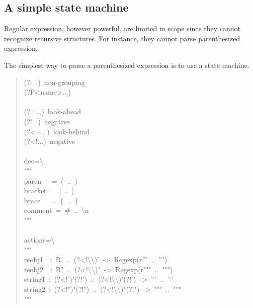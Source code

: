 \documentclass[10pt,english]{article}
\begin{document}

\hypertarget{a-simple-state-machine}{}
\subsection*{A simple state machine}

Regular expression, however powerful, are limited in scope since they
cannot recognize recursive structures. For instance, they cannot parse
parenthesized expression.

The simplest way to parse a parenthesized expression is to use a state
machine.
\begin{quote}
\begin{ttfamily}\begin{flushleft}
\mbox{(?:...)~non-grouping}\\
\mbox{(?P<name>...)~}\\
\mbox{}\\
\mbox{(?=...)~look-ahead~}\\
\mbox{(?!...)~negative}\\
\mbox{(?<=...)~look-behind~}\\
\mbox{(?<!...)~negative}\\
\mbox{}\\
\mbox{dec={\textbackslash}}\\
\mbox{"""}\\
\mbox{paren~~~=~(~..~)}\\
\mbox{bracket~=~[~..~]}\\
\mbox{brace~~~=~{\{}~..~{\}}}\\
\mbox{comment~=~{\#}~..~{\textbackslash}n}\\
\mbox{"""}\\
\mbox{}\\
\mbox{actions={\textbackslash}}\\
\mbox{"""}\\
\mbox{reobj1~~:~R'~..~(?<!{\textbackslash}{\textbackslash})'~->~Regexp(r'''~..~''')}\\
\mbox{reobj2~~:~R"~..~(?<!{\textbackslash}{\textbackslash})"~->~Regexp(r"""~..~""")}\\
\mbox{string1~:~(?<!')'(?!')~..~(?<!{\textbackslash}{\textbackslash})'(?!')~->~'''~..~'''}\\
\mbox{string2~:~(?<!")"(?!")~..~(?<!{\textbackslash}{\textbackslash})"(?!")~->~"""~..~"""}\\
\mbox{"""}\\

\end{flushleft}
\end{ttfamily}
\end{quote}
\end{document}
